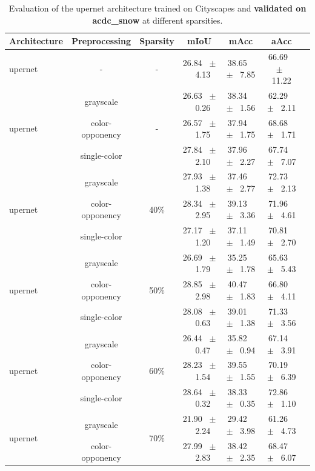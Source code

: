 \begin{table}[h]
  \centering
  \caption{Evaluation of the upernet architecture trained on Cityscapes and \textbf{validated on acdc_snow} at different sparsities.}
  \begin{tabular}{@{}lccc ccc@{}}
    \toprule
    Architecture & Preprocessing & Sparsity & mIoU & mAcc & aAcc \\
    \midrule
    upernet & - & - & 26.84 ~$\pm$~ 4.13 & 38.65 ~$\pm$~ 7.85 & 66.69 ~$\pm$~ 11.22 \\
    \midrule
    \midrule
    \multirow{3}{*}{upernet} & grayscale & \multirow{3}{*}{-} & 26.63 ~$\pm$~ 0.26 & 38.34 ~$\pm$~ 1.56 & 62.29 ~$\pm$~ 2.11 \\
    & color-opponency & & 26.57 ~$\pm$~ 1.75 & 37.94 ~$\pm$~ 1.75 & 68.68 ~$\pm$~ 1.71 \\
    & single-color & & 27.84 ~$\pm$~ 2.10 & 37.96 ~$\pm$~ 2.27 & 67.74 ~$\pm$~ 7.07 \\
    \midrule
    \multirow{3}{*}{upernet} & grayscale & \multirow{3}{*}{40\%} & 27.93 ~$\pm$~ 1.38 & 37.46 ~$\pm$~ 2.77 & 72.73 ~$\pm$~ 2.13 \\
    & color-opponency & & 28.34 ~$\pm$~ 2.95 & 39.13 ~$\pm$~ 3.36 & 71.96 ~$\pm$~ 4.61 \\
    & single-color & & 27.17 ~$\pm$~ 1.20 & 37.11 ~$\pm$~ 1.49 & 70.81 ~$\pm$~ 2.70 \\
    \midrule
    \multirow{3}{*}{upernet} & grayscale & \multirow{3}{*}{50\%} & 26.69 ~$\pm$~ 1.79 & 35.25 ~$\pm$~ 1.78 & 65.63 ~$\pm$~ 5.43 \\
    & color-opponency & & 28.85 ~$\pm$~ 2.98 & 40.47 ~$\pm$~ 1.83 & 66.80 ~$\pm$~ 4.11 \\
    & single-color & & 28.08 ~$\pm$~ 0.63 & 39.01 ~$\pm$~ 1.38 & 71.33 ~$\pm$~ 3.56 \\
    \midrule
    \multirow{3}{*}{upernet} & grayscale & \multirow{3}{*}{60\%} & 26.44 ~$\pm$~ 0.47 & 35.82 ~$\pm$~ 0.94 & 67.14 ~$\pm$~ 3.91 \\
    & color-opponency & & 28.23 ~$\pm$~ 1.54 & 39.55 ~$\pm$~ 1.55 & 70.19 ~$\pm$~ 6.39 \\
    & single-color & & 28.64 ~$\pm$~ 0.32 & 38.33 ~$\pm$~ 0.35 & 72.86 ~$\pm$~ 1.10 \\
    \midrule
    \multirow{3}{*}{upernet} & grayscale & \multirow{3}{*}{70\%} & 21.90 ~$\pm$~ 2.24 & 29.42 ~$\pm$~ 3.98 & 61.26 ~$\pm$~ 4.73 \\
    & color-opponency & & 27.99 ~$\pm$~ 2.83 & 38.42 ~$\pm$~ 2.35 & 68.47 ~$\pm$~ 6.07 \\

\end{tabular}
\end{table}
